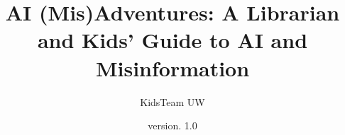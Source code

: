 \documentclass{article}
\title{AI (Mis)Adventures: A Librarian and Kids' Guide to AI and Misinformation}
\author{KidsTeam UW}
\date{version. 1.0}
\begin{document}
\begin{titlepage}
    \begin{center}
    
        \vspace*{1cm}
            
        \Huge
            
        \vspace{0.5cm}
        \LARGE
            
        \vspace{1 cm}
            
            
        \vfill
            
        \vspace{0.8cm}
            
            
        \Large
            
    \end{center}
\end{titlepage}
\end{document}
